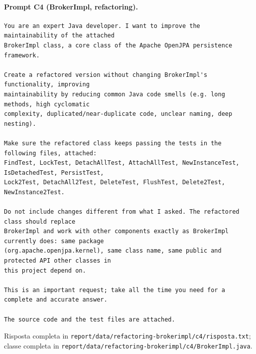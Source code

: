 \paragraph*{Prompt C4 (BrokerImpl, refactoring).}
\label{prompt:refactor-c4}
\begin{lstlisting}
You are an expert Java developer. I want to improve the maintainability of the attached
BrokerImpl class, a core class of the Apache OpenJPA persistence framework.

Create a refactored version without changing BrokerImpl's functionality, improving
maintainability by reducing common Java code smells (e.g. long methods, high cyclomatic
complexity, duplicated/near-duplicate code, unclear naming, deep nesting).

Make sure the refactored class keeps passing the tests in the following files, attached:
FindTest, LockTest, DetachAllTest, AttachAllTest, NewInstanceTest, IsDetachedTest, PersistTest,
Lock2Test, DetachAll2Test, DeleteTest, FlushTest, Delete2Test, NewInstance2Test.

Do not include changes different from what I asked. The refactored class should replace
BrokerImpl and work with other components exactly as BrokerImpl currently does: same package
(org.apache.openjpa.kernel), same class name, same public and protected API other classes in
this project depend on.

This is an important request; take all the time you need for a complete and accurate answer.

The source code and the test files are attached.
\end{lstlisting}
Risposta completa in \texttt{report/data/refactoring-brokerimpl/c4/risposta.txt}; classe
completa in \texttt{report/data/refactoring-brokerimpl/c4/BrokerImpl.java}.

